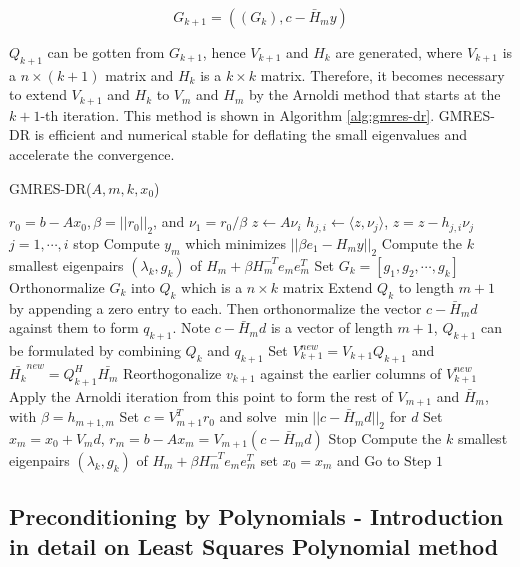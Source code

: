 \begin{equation}
	G_{k+1}= ((G_k), c-\bar{H}_my)
\end{equation}

$Q_{k+1}$ can be gotten from $G_{k+1}$, hence $V_{k+1}$ and $H_k$ are generated, where $V_{k+1}$ is a $n \times (k+1)$ matrix and $H_k$ is a $k \times k$ matrix. Therefore, it becomes necessary to extend $V_{k+1}$ and $H_k$ to $V_m$ and $H_m$ by the Arnoldi method that starts at the $k+1$-th iteration. This method is shown in Algorithm \ref{alg:gmres-dr}. GMRES-DR is efficient and numerical stable for deflating the small eigenvalues and accelerate the convergence.

\begin{algorithm}[t]
	\caption{GMRES-DR($A, m,k,x_0$)}
	\label{alg:gmres-dr}
	\begin{algorithmic}[1]
		\State $r_0=b-A x_0, \beta=||r_0||_2$, and $\nu_1=r_0/\beta$
		\State $z \leftarrow A\nu_i$
		\State $h_{j,i} \leftarrow \langle z,\nu_j\rangle$, $z = z- h_{j,i}\nu_j$ $j=1,\cdots,i$
		\State stop
		\Else
		\EndIf
		\EndFor
		\State Compute $y_m$ which minimizes $||\beta e_1-H_m y||_2$ 
		\State Compute the $k$ smallest eigenpairs $(\lambda_k, g_k)$ of $H_m+\beta H_m^{-T}e_me_m^T$
		\State Set $G_k=[g_1,g_2,\cdots,g_k]$
		\State Orthonormalize $G_k$ into $Q_{k}$ which is a $n \times k$ matrix
		\State Extend $Q_k$ to length $m+1$ by appending a zero entry to each. Then orthonormalize the vector $c-\bar{H}_m d$ against them to form $q_{k+1}$. Note $c-\bar{H}_m d$ is a vector of length $m+1$, $Q_{k+1}$ can be formulated by combining $Q_k$ and $q_{k+1}$
		\State Set $V_{k+1}^{new} = V_{k+1}Q_{k+1}$ and $\bar{H_{k}}^{new} = Q_{k+1}^H \bar{H_m}$
		\State Reorthogonalize $v_{k+1}$ against the earlier columns of $V_{k+1}^{new}$
		\State Apply the Arnoldi iteration from this point to form the rest of $V_{m+1}$ and $\bar{H}_m$, with $\beta=h_{m+1,m}$
		\State Set $c=V_{m+1}^Tr_0$ and solve $\min||c-\bar{H}_md||_2$ for $d$
		\State Set $x_m=x_0+V_md$, $r_m=b-Ax_m=V_{m+1}(c-\bar{H}_md)$
		\State Stop
		\EndIf
		\State  Compute the $k$ smallest eigenpairs $(\lambda_k, g_k)$ of $H_m+\beta H_m^{-T}e_me_m^T$
		\State set $x_0 = x_m$ and Go to Step $1$
	\end{algorithmic}
\end{algorithm}

\subsection{Preconditioning by Polynomials - Introduction in detail on Least Squares Polynomial method}

